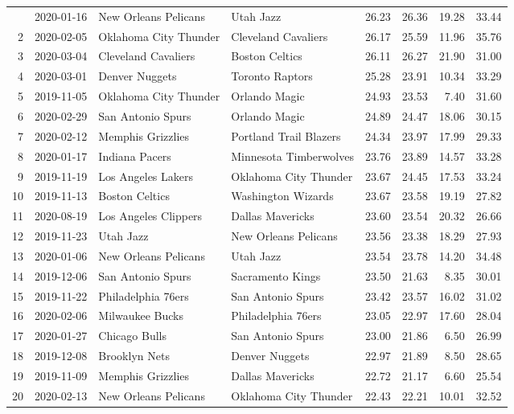 \documentclass[
  11pt,
]{article}
\theoremstyle{nonumberplain}
\begin{document}
\begin{longtable}{rl|llr|rrr}
\endfoot
\bottomrule
\endlastfoot
1 & 2020-01-16 & New Orleans Pelicans & Utah Jazz & 26.23 & 26.36 & 19.28 & 33.44\\
2 & 2020-02-05 & Oklahoma City Thunder & Cleveland Cavaliers & 26.17 & 25.59 & 11.96 & 35.76\\
3 & 2020-03-04 & Cleveland Cavaliers & Boston Celtics & 26.11 & 26.27 & 21.90 & 31.00\\
4 & 2020-03-01 & Denver Nuggets & Toronto Raptors & 25.28 & 23.91 & 10.34 & 33.29\\
5 & 2019-11-05 & Oklahoma City Thunder & Orlando Magic & 24.93 & 23.53 & 7.40 & 31.60\\
6 & 2020-02-29 & San Antonio Spurs & Orlando Magic & 24.89 & 24.47 & 18.06 & 30.15\\
7 & 2020-02-12 & Memphis Grizzlies & Portland Trail Blazers & 24.34 & 23.97 & 17.99 & 29.33\\
8 & 2020-01-17 & Indiana Pacers & Minnesota Timberwolves & 23.76 & 23.89 & 14.57 & 33.28\\
9 & 2019-11-19 & Los Angeles Lakers & Oklahoma City Thunder & 23.67 & 24.45 & 17.53 & 33.24\\
10 & 2019-11-13 & Boston Celtics & Washington Wizards & 23.67 & 23.58 & 19.19 & 27.82\\
11 & 2020-08-19 & Los Angeles Clippers & Dallas Mavericks & 23.60 & 23.54 & 20.32 & 26.66\\
12 & 2019-11-23 & Utah Jazz & New Orleans Pelicans & 23.56 & 23.38 & 18.29 & 27.93\\
13 & 2020-01-06 & New Orleans Pelicans & Utah Jazz & 23.54 & 23.78 & 14.20 & 34.48\\
14 & 2019-12-06 & San Antonio Spurs & Sacramento Kings & 23.50 & 21.63 & 8.35 & 30.01\\
15 & 2019-11-22 & Philadelphia 76ers & San Antonio Spurs & 23.42 & 23.57 & 16.02 & 31.02\\
16 & 2020-02-06 & Milwaukee Bucks & Philadelphia 76ers & 23.05 & 22.97 & 17.60 & 28.04\\
17 & 2020-01-27 & Chicago Bulls & San Antonio Spurs & 23.00 & 21.86 & 6.50 & 26.99\\
18 & 2019-12-08 & Brooklyn Nets & Denver Nuggets & 22.97 & 21.89 & 8.50 & 28.65\\
19 & 2019-11-09 & Memphis Grizzlies & Dallas Mavericks & 22.72 & 21.17 & 6.60 & 25.54\\
20 & 2020-02-13 & New Orleans Pelicans & Oklahoma City Thunder & 22.43 & 22.21 & 10.01 & 32.52\\

\end{longtable}
\end{document}
